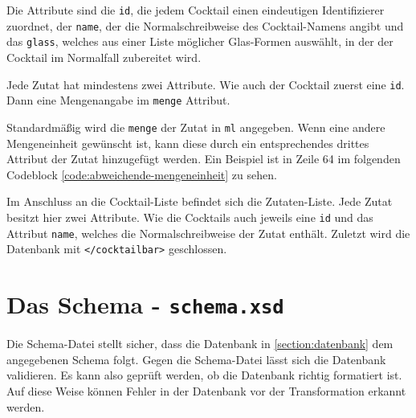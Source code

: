Die Attribute sind die \texttt{id}, die jedem Cocktail einen eindeutigen Identifizierer zuordnet, der \texttt{name}, der die Normalschreibweise des Cocktail-Namens angibt und das \texttt{glass}, welches aus einer Liste möglicher Glas-Formen auswählt, in der der Cocktail im Normalfall zubereitet wird.

Jede Zutat hat mindestens zwei Attribute. Wie auch der Cocktail zuerst eine \texttt{id}. Dann eine Mengenangabe im \texttt{menge} Attribut.








Standardmäßig wird die \texttt{menge} der Zutat in \texttt{ml} angegeben. Wenn eine andere Mengeneinheit gewünscht ist, kann diese durch ein entsprechendes drittes Attribut der Zutat hinzugefügt werden. Ein Beispiel ist in Zeile 64 im folgenden Codeblock \ref{code:abweichende-mengeneinheit} zu sehen. 







Im Anschluss an die Cocktail-Liste befindet sich die Zutaten-Liste. Jede Zutat besitzt hier zwei Attribute. Wie die Cocktails auch jeweils eine \texttt{id} und das Attribut \texttt{name}, welches die Normalschreibweise der Zutat enthält. Zuletzt wird die Datenbank mit \texttt{</cocktailbar>} geschlossen.









\section{Das Schema - \texttt{schema.xsd}}
\label{section:schema}

Die Schema-Datei stellt sicher, dass die Datenbank in \ref{section:datenbank} dem angegebenen Schema folgt.
Gegen die Schema-Datei lässt sich die Datenbank validieren. Es kann also geprüft werden, ob die Datenbank richtig formatiert ist.
Auf diese Weise können Fehler in der Datenbank vor der Transformation erkannt werden.

